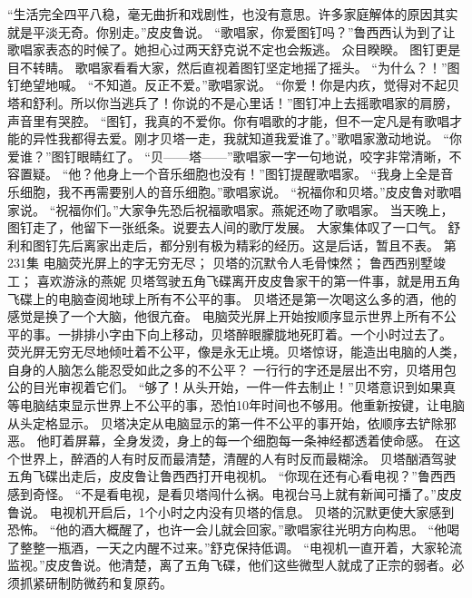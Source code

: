 \documentclass[a4paper,12pt,UTF8,twoside]{ctexbook}
\begin{document}
        “生活完全四平八稳，毫无曲折和戏剧性，也没有意思。许多家庭解体的原因其实就是平淡无奇。你别走。”皮皮鲁说。  
        “歌唱家，你爱图钉吗？”鲁西西认为到了让歌唱家表态的时候了。她担心过两天舒克说不定也会叛逃。  
        众目睽睽。  
        图钉更是目不转睛。  
        歌唱家看看大家，然后直视着图钉坚定地摇了摇头。        
        “为什么？！”图钉绝望地喊。  
        “不知道。反正不爱。”歌唱家说。  
        “你爱！你是内疚，觉得对不起贝塔和舒利。所以你当逃兵了！你说的不是心里话！”图钉冲上去摇歌唱家的肩膀，声音里有哭腔。  
        “图钉，我真的不爱你。你有唱歌的才能，但不一定凡是有歌唱才能的异性我都得去爱。刚才贝塔一走，我就知道我爱谁了。”歌唱家激动地说。  
        “你爱谁？”图钉眼睛红了。  
        “贝——塔——”歌唱家一字一句地说，咬字非常清晰，不容置疑。  
        “他？他身上一个音乐细胞也没有！”图钉提醒歌唱家。  
        “我身上全是音乐细胞，我不再需要别人的音乐细胞。”歌唱家说。  
        “祝福你和贝塔。”皮皮鲁对歌唱家说。  
        “祝福你们。”大家争先恐后祝福歌唱家。燕妮还吻了歌唱家。  
        当天晚上，图钉走了，他留下一张纸条。说要去人间的歌厅发展。  
        大家集体叹了一口气。  
        舒利和图钉先后离家出走后，都分别有极为精彩的经历。这是后话，暂且不表。          第231集  
        电脑荧光屏上的字无穷无尽；  
        贝塔的沉默令人毛骨悚然；  
        鲁西西别墅竣工；  
        喜欢游泳的燕妮    
        贝塔驾驶五角飞碟离开皮皮鲁家干的第一件事，就是用五角飞碟上的电脑查阅地球上所有不公平的事。  
        贝塔还是第一次喝这么多的酒，他的感觉是换了一个大脑，他很亢奋。  
        电脑荧光屏上开始按顺序显示世界上所有不公平的事。一排排小字由下向上移动，贝塔醉眼朦胧地死盯着。一个小时过去了。  
        荧光屏无穷无尽地倾吐着不公平，像是永无止境。贝塔惊讶，能造出电脑的人类，自身的人脑怎么能忍受如此之多的不公平？  
        一行行的字还是层出不穷，贝塔用包公的目光审视着它们。  
        “够了！从头开始，一件一件去制止！”贝塔意识到如果真等电脑结束显示世界上不公平的事，恐怕10年时间也不够用。他重新按键，让电脑从头定格显示。  
        贝塔决定从电脑显示的第一件不公平的事开始，依顺序去铲除邪恶。  
        他盯着屏幕，全身发烫，身上的每一个细胞每一条神经都透着使命感。  
        在这个世界上，醉酒的人有时反而最清楚，清醒的人有时反而最糊涂。  
        贝塔酗酒驾驶五角飞碟出走后，皮皮鲁让鲁西西打开电视机。  
        “你现在还有心看电视？”鲁西西感到奇怪。  
        “不是看电视，是看贝塔闯什么祸。电视台马上就有新闻可播了。”皮皮鲁说。  
        电视机开启后，1个小时之内没有贝塔的信息。  
        贝塔的沉默更使大家感到恐怖。  
        “他的酒大概醒了，也许一会儿就会回家。”歌唱家往光明方向构思。  
        “他喝了整整一瓶酒，一天之内醒不过来。”舒克保持低调。  
        “电视机一直开着，大家轮流监视。”皮皮鲁说。他清楚，离了五角飞碟，他们这些微型人就成了正宗的弱者。必须抓紧研制防微药和复原药。  
\end{document}
